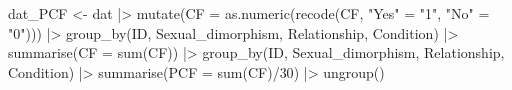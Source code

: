 \documentclass[
  bookmarksnumbered]{article}
\newenvironment{Shaded}{\begin{snugshade}}{\end{snugshade}}
\newcommand{\AttributeTok}[1]{\textcolor[rgb]{0.80,0.80,0.80}{#1}}
\newcommand{\DecValTok}[1]{\textcolor[rgb]{0.86,0.86,0.80}{#1}}
\newcommand{\FunctionTok}[1]{\textcolor[rgb]{0.94,0.94,0.56}{#1}}
\newcommand{\NormalTok}[1]{\textcolor[rgb]{0.80,0.80,0.80}{#1}}
\newcommand{\OtherTok}[1]{\textcolor[rgb]{0.94,0.94,0.56}{#1}}
\newcommand{\SpecialCharTok}[1]{\textcolor[rgb]{0.86,0.64,0.64}{#1}}
\newcommand{\StringTok}[1]{\textcolor[rgb]{0.80,0.58,0.58}{#1}}
\begin{document}
\begin{Shaded}
\begin{Highlighting}[]
\NormalTok{dat\_PCF }\OtherTok{\textless{}{-}}\NormalTok{ dat }\SpecialCharTok{|\textgreater{}} 
  \FunctionTok{mutate}\NormalTok{(}\AttributeTok{CF =} \FunctionTok{as.numeric}\NormalTok{(}\FunctionTok{recode}\NormalTok{(CF,}
                                \StringTok{"Yes"} \OtherTok{=}  \StringTok{"1"}\NormalTok{,}
                                \StringTok{"No"} \OtherTok{=} \StringTok{"0"}\NormalTok{))) }\SpecialCharTok{|\textgreater{}} 
  \FunctionTok{group\_by}\NormalTok{(ID, Sexual\_dimorphism, Relationship, Condition) }\SpecialCharTok{|\textgreater{}} 
  \FunctionTok{summarise}\NormalTok{(}\AttributeTok{CF =} \FunctionTok{sum}\NormalTok{(CF)) }\SpecialCharTok{|\textgreater{}} 
  \FunctionTok{group\_by}\NormalTok{(ID, Sexual\_dimorphism, Relationship, Condition) }\SpecialCharTok{|\textgreater{}} 
  \FunctionTok{summarise}\NormalTok{(}\AttributeTok{PCF =} \FunctionTok{sum}\NormalTok{(CF)}\SpecialCharTok{/}\DecValTok{30}\NormalTok{) }\SpecialCharTok{|\textgreater{}} 
  \FunctionTok{ungroup}\NormalTok{()}


\end{Highlighting}
\end{Shaded}
\end{document}

